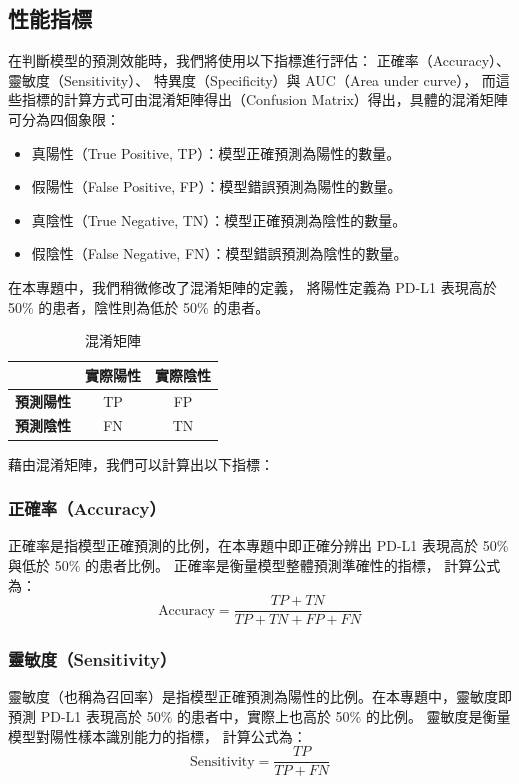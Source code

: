 \documentclass[12pt,a4paper]{article}
\begin{document}
\subsection{性能指標}

在判斷模型的預測效能時，我們將使用以下指標進行評估：
正確率（Accuracy）、靈敏度（Sensitivity）、  特異度（Specificity）與 AUC（Area under curve），
而這些指標的計算方式可由混淆矩陣得出（Confusion Matrix）得出，具體的混淆矩陣可分為四個象限：
\begin{itemize}
    \item 真陽性（True Positive, TP）：模型正確預測為陽性的數量。
    \item 假陽性（False Positive, FP）：模型錯誤預測為陽性的數量。
    \item 真陰性（True Negative, TN）：模型正確預測為陰性的數量。
    \item 假陰性（False Negative, FN）：模型錯誤預測為陰性的數量。
\end{itemize}

在本專題中，我們稍微修改了混淆矩陣的定義，
將陽性定義為 PD-L1 表現高於 50\% 的患者，陰性則為低於 50\% 的患者。

\begin{table}[h]
\centering
\begin{tabular}{|c|c|c|}
\hline
 & \textbf{實際陽性} & \textbf{實際陰性} \\ \hline
\textbf{預測陽性} & TP & FP \\ \hline
\textbf{預測陰性} & FN & TN \\ \hline
\end{tabular}
\caption{混淆矩陣}
\end{table}

藉由混淆矩陣，我們可以計算出以下指標：

\subsubsection{正確率（Accuracy）}
正確率是指模型正確預測的比例，在本專題中即正確分辨出 PD-L1 表現高於 50\% 與低於 50\% 的患者比例。
正確率是衡量模型整體預測準確性的指標，
計算公式為：
\begin{equation}
\text{Accuracy} = \frac{TP + TN}{TP + TN + FP + FN}
\end{equation}

\subsubsection{靈敏度（Sensitivity）}
靈敏度（也稱為召回率）是指模型正確預測為陽性的比例。在本專題中，靈敏度即預測 PD-L1 表現高於 50\% 的患者中，實際上也高於 50\% 的比例。
靈敏度是衡量模型對陽性樣本識別能力的指標，
計算公式為：
\begin{equation}
\text{Sensitivity} = \frac{TP}{TP + FN}
\end{equation}
\end{document}
